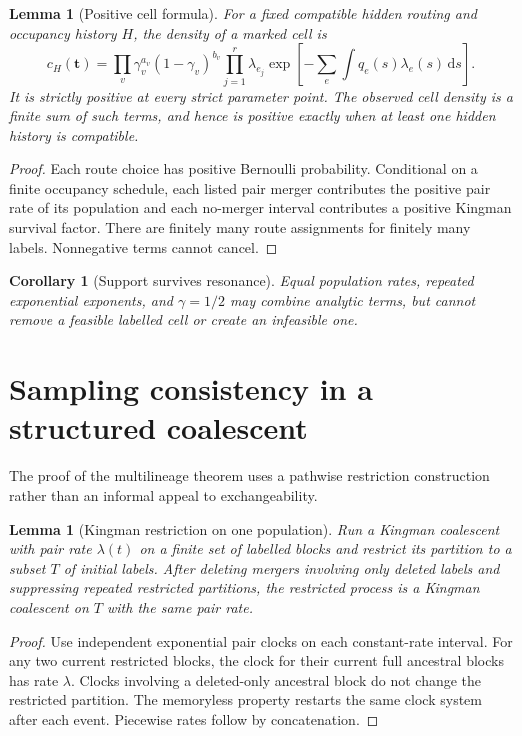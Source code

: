 \documentclass[11pt]{article}
\newtheorem{lemma}[theorem]{Lemma}
\newtheorem{corollary}[theorem]{Corollary}
\newcommand{\dd}{\,\mathrm d}
\begin{document}
\begin{lemma}[Positive cell formula]
\label{lem:positive-cell}
For a fixed compatible hidden routing and occupancy history $H$, the density of a marked cell is
\[
 c_H(\mathbf t)=
 \prod_v\gamma_v^{a_v}(1-\gamma_v)^{b_v}
 \prod_{j=1}^r\lambda_{e_j}
 \exp\!\left[-\sum_e\int q_e(s)\lambda_e(s)\dd s\right].
\]
It is strictly positive at every strict parameter point.  The observed cell density is a finite sum of such terms, and hence is positive exactly when at least one hidden history is compatible.
\end{lemma}

\begin{proof}
Each route choice has positive Bernoulli probability.  Conditional on a finite occupancy schedule, each listed pair merger contributes the positive pair rate of its population and each no-merger interval contributes a positive Kingman survival factor.  There are finitely many route assignments for finitely many labels.  Nonnegative terms cannot cancel.
\end{proof}

\begin{corollary}[Support survives resonance]
Equal population rates, repeated exponential exponents, and $\gamma=1/2$ may combine analytic terms, but cannot remove a feasible labelled cell or create an infeasible one.
\end{corollary}

\section{Sampling consistency in a structured coalescent}
The proof of the multilineage theorem uses a pathwise restriction construction rather than an informal appeal to exchangeability.

\begin{lemma}[Kingman restriction on one population]
\label{lem:kingman-restriction}
Run a Kingman coalescent with pair rate $\lambda(t)$ on a finite set of labelled blocks and restrict its partition to a subset $T$ of initial labels.  After deleting mergers involving only deleted labels and suppressing repeated restricted partitions, the restricted process is a Kingman coalescent on $T$ with the same pair rate.
\end{lemma}

\begin{proof}
Use independent exponential pair clocks on each constant-rate interval.  For any two current restricted blocks, the clock for their current full ancestral blocks has rate $\lambda$.  Clocks involving a deleted-only ancestral block do not change the restricted partition.  The memoryless property restarts the same clock system after each event.  Piecewise rates follow by concatenation.
\end{proof}
\end{document}
